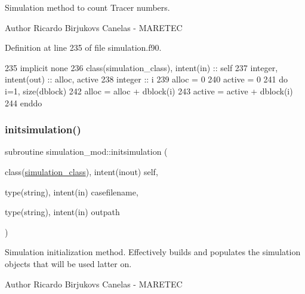 Simulation method to count Tracer numbers. 

\begin{DoxyAuthor}{Author}
Ricardo Birjukovs Canelas -\/ M\+A\+R\+E\+T\+EC 
\end{DoxyAuthor}


Definition at line 235 of file simulation.\+f90.


\begin{DoxyCode}
235     \textcolor{keywordtype}{implicit none}
236     \textcolor{keywordtype}{class}(simulation\_class), \textcolor{keywordtype}{intent(in)} :: self
237     \textcolor{keywordtype}{integer}, \textcolor{keywordtype}{intent(out)} :: alloc, active
238     \textcolor{keywordtype}{integer} :: i
239     alloc = 0
240     active = 0
241     \textcolor{keywordflow}{do} i=1, \textcolor{keyword}{size}(dblock)
242         alloc = alloc + dblock(i)%
243         active = active + dblock(i)%
244 \textcolor{keywordflow}{    enddo}        
\end{DoxyCode}
\mbox{\label{namespacesimulation__mod_aedbba2bb458cbcd7eb93938a5f7b5940}} 
\subsubsection{\texorpdfstring{initsimulation()}{initsimulation()}}
{\footnotesize\ttfamily subroutine simulation\+\_\+mod\+::initsimulation (\begin{DoxyParamCaption}\item[{class(\mbox{\hyperlink{structsimulation__mod_1_1simulation__class}{simulation\+\_\+class}}), intent(inout)}]{self,  }\item[{type(string), intent(in)}]{casefilename,  }\item[{type(string), intent(in)}]{outpath }\end{DoxyParamCaption})\hspace{0.3cm}{\ttfamily [private]}}



Simulation initialization method. Effectively builds and populates the simulation objects that will be used latter on. 

\begin{DoxyAuthor}{Author}
Ricardo Birjukovs Canelas -\/ M\+A\+R\+E\+T\+EC
\end{DoxyAuthor}

